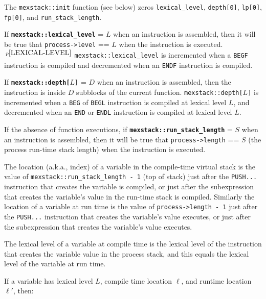 \documentclass[12pt]{article}
\newcommand{\TT}[1]{{\tt \bfseries #1}}
\newcommand{\pagnote}[1]{$\,^{p\pageref{#1}}$}
\newcommand{\EOL}{\penalty \exhyphenpenalty}
\newenvironment{indpar}[1][0.3in]%
	{\begin{list}{}%
		     {\setlength{\itemsep}{0in}%
		      \setlength{\topsep}{0in}%
		      \setlength{\parsep}{1ex}%
		      \setlength{\labelwidth}{#1}%
		      \setlength{\leftmargin}{#1}%
		      \addtolength{\leftmargin}{\labelsep}}%
	 \item}%
	{\end{list}}
\begin{document}
\begin{indpar}
The {\tt mexstack::init} function (see below) zeros {\tt lexical\_level},
{\tt depth[0]}, {\tt lp[0]}, {\tt fp[0]}, and {\tt run\_stack\_length}.

If \TT{mexstack::lexical\_level} = $L$
when an instruction is assembled,
then it will be true that {\tt process->level} == $L$ when the instruction
is executed.\pagnote{LEXICAL-LEVEL}
{\tt mexstack::\EOL lexical\_\EOL level} is incremented when a {\tt BEGF}
instruction is compiled and decremented when an {\tt ENDF}
instruction is compiled.

If \TT{mexstack::depth[$L$]} = $D$\label{DEPTH}
when an instruction is assembled,
then the instruction is inside $D$ subblocks of the current function.
{\tt mexstack::depth[$L$]} is incremented when a {\tt BEG} of {\tt BEGL}
instruction is compiled at lexical level $L$, and decremented when
an {\tt END} or {\tt ENDL} instruction is compiled at lexical level $L$.

If the absence of function executions, if
\TT{mexstack::run\_stack\_length} = $S$\label{RUN-STACK-LENGTH}
when an instruction is assembled,
then it will be true that {\tt process->length} == $S$ (the process run-time
stack length) when the instruction is executed.

The location (a.k.a., index) of a variable in the compile-time virtual stack
is the value of
{\tt mexstack::\EOL run\_\EOL stack\_\EOL length - 1} (top of stack)
just after the {\tt PUSH...}
instruction that creates the variable is compiled, or just after
the subexpression that creates the variable's value in the run-time
stack is compiled.
Similarly the location of a variable at run time is the value of
{\tt process->length - 1} just after the {\tt PUSH...}
instruction that creates the variable's value executes, or just after
the subexpression that creates the variable's value executes.

The lexical level of a variable at compile time is the lexical
level of the instruction that creates the variable value in
the process stack, and this equals the lexical level of the variable
at run time.

If a variable has lexical level $L$, compile time location $\ell$,
and runtime location $\ell'$, then:\label{FP} \\
\hspace*{1in}{\tt $\ell$ - mexstack::fp[$L$] == $\ell'$ - process->fp[$L$]}


\end{indpar}
\end{document}
